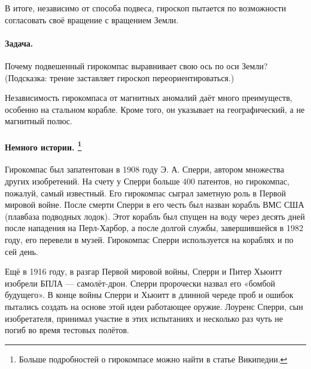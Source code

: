 В итоге, независимо от способа подвеса, гироскоп пытается по возможности согласовать своё вращение с вращением Земли.

\paragraph{Задача.} Почему подвешенный гирокомпас выравнивает свою ось по оси Земли?
(Подсказка: трение заставляет гироскоп переориентироваться.)

\medskip

Независимость гирокомпаса от магнитных аномалий даёт много преимуществ, особенно на стальном корабле.
Кроме того, он указывает на географический, а не магнитный полюс.

\paragraph[Немного истории.]%
{Немного истории.%
\footnote{Больше подробностей о гирокомпасе можно найти в статье Википедии.}
}
Гирокомпас был запатентован в 1908 году Э. А. Сперри, автором множества других изобретений.
На счету у Сперри больше 400 патентов, но гирокомпас, пожалуй, самый известный.
Его гирокомпас сыграл заметную роль в Первой мировой войне.
После смерти Сперри в его честь был назван корабль ВМС США (плавбаза подводных лодок).
Этот корабль был спущен на воду через десять дней после нападения на Перл-Харбор, а после долгой службы, завершившейся в 1982 году, его перевели в музей.
Гирокомпас Сперри используется на кораблях и по сей день.

Ещё в 1916 году, в разгар Первой мировой войны,
Сперри и Питер Хьюитт изобрели БПЛА --- самолёт-дрон.
Сперри пророчески назвал его «бомбой будущего».
В конце войны Сперри и Хьюитт в длинной череде проб и ошибок пытались создать на основе этой идеи работающее оружие.
Лоуренс Сперри, сын изобретателя, принимал участие в этих испытаниях и несколько раз чуть не погиб во время тестовых полётов.
